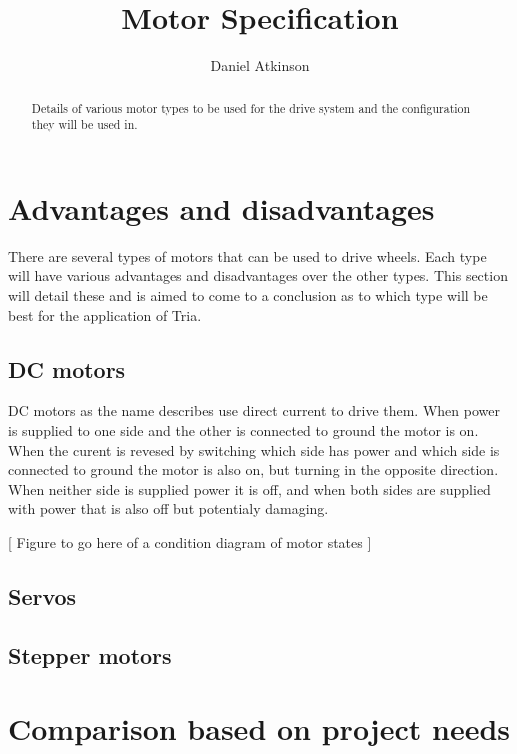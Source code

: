\documentclass{article}
\begin{document}
\title{Motor Specification}

\author{Daniel Atkinson}

\maketitle

\begin{abstract}

Details of various motor types to be used for the drive system and the configuration they will be used in.

\end{abstract}


\section{Advantages and disadvantages}
There are several types of motors that can be used to drive wheels.  Each type will have various advantages and disadvantages over the other types.  This section will detail these and is aimed to come to a conclusion as to which type will be best for the application of Tria.

\subsection{DC motors}
DC motors as the name describes use direct current to drive them.  When power is supplied to one side and the other is connected to ground the motor is on.  When the curent is revesed by switching which side has power and which side is connected to ground the motor is also on, but turning in the opposite direction.  When neither side is supplied power it is off, and when both sides are supplied with power that is also off but potentialy damaging.

[ Figure to go here of a condition diagram of motor states ]

\subsection{Servos}

\subsection{Stepper motors}


\section{Comparison based on project needs}
\end{document}
